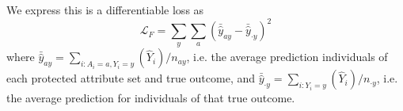         We express this is a differentiable loss as 
        $$
            \mathcal{L}_F = \sum\limits_{y} \sum\limits_{a} \left( \bar{\hat{y}}_{ay} - \bar{\hat{y}}_{\cdot y} \right)^2
        $$
        where $\bar{\hat{y}}_{ay} = \sum_{i: A_i = a, Y_i = y}(\hat{Y}_i) / n_{ay}$, i.e. the average prediction individuals of each protected attribute set and true outcome, and $\bar{\hat{y}}_{\cdot y} = \sum_{i: Y_i = y}(\hat{Y}_i) / n_{\cdot y}$, i.e. the average prediction for individuals of that true outcome.
        
        
    

    
